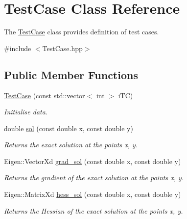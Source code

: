 \hypertarget{classTestCase}{}\section{Test\+Case Class Reference}
\label{classTestCase}


The \hyperlink{classTestCase}{Test\+Case} class provides definition of test cases.  




{\ttfamily \#include $<$Test\+Case.\+hpp$>$}

\subsection*{Public Member Functions}
\begin{DoxyCompactItemize}
\item 
\hyperlink{classTestCase_aa4ad29533416ee515205db87002a1bf1}{Test\+Case} (const std\+::vector$<$ int $>$ i\+TC)
\begin{DoxyCompactList}\small\item\em Initialise data. \end{DoxyCompactList}\item 
double \hyperlink{classTestCase_aede719dac81c460c713d930a379c537e}{sol} (const double x, const double y)
\begin{DoxyCompactList}\small\item\em Returns the exact solution at the points x, y. \end{DoxyCompactList}\item 
\mbox{\label{classTestCase_ac6ea8a6757e14702acde6aa73270c5b8}} 
Eigen\+::\+Vector\+Xd \hyperlink{classTestCase_ac6ea8a6757e14702acde6aa73270c5b8}{grad\+\_\+sol} (const double x, const double y)
\begin{DoxyCompactList}\small\item\em Returns the gradient of the exact solution at the points x, y. \end{DoxyCompactList}\item 
\mbox{\label{classTestCase_aefa0d363c18d007e5fa7c75df2c319fa}} 
Eigen\+::\+Matrix\+Xd \hyperlink{classTestCase_aefa0d363c18d007e5fa7c75df2c319fa}{hess\+\_\+sol} (const double x, const double y)
\begin{DoxyCompactList}\small\item\em Returns the Hessian of the exact solution at the points x, y. \end{DoxyCompactList}\item 

\end{DoxyCompactItemize}
